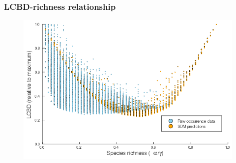 \documentclass[10pt]{beamer}
\begin{document}
\begin{frame}
  \frametitle{LCBD-richness relationship}
  \begin{figure}
    \centering
    \includegraphics[scale=0.4]{fig/06_cmb_relation-oneplot.png}
  \end{figure}
\end{frame}
\end{document}
